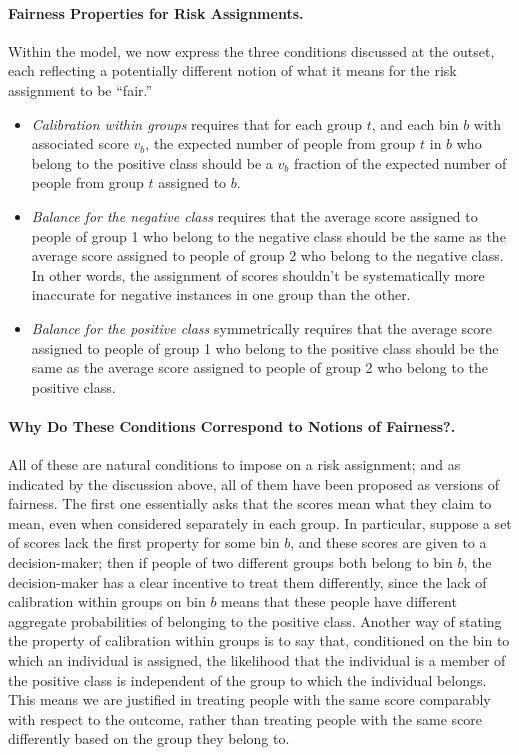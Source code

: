 \documentclass[11pt]{article}
\newcommand{\xhdr}[1]{\vspace{-0.2in} \paragraph*{\bf {#1}.}}
\begin{document}
\xhdr{Fairness Properties for Risk Assignments}
Within the model, we now express the three conditions
discussed at the outset, each reflecting
a potentially different notion of what it means for the
risk assignment to be ``fair.''

\begin{itemize}
\item[(A)] {\em Calibration within groups} requires that for
each group $t$, and each bin $b$ with associated score $v_b$,
the expected number of people from group $t$ in $b$ who belong
to the positive class should be a $v_b$ fraction of the expected number
of people from group $t$ assigned to $b$.
\item[(B)] {\em Balance for the negative class} requires that
the average score assigned to people of group 1 who belong to the
negative class should be the same as
the average score assigned to people of group 2 who belong to the
negative class.
In other words, the assignment of scores shouldn't be systematically
more inaccurate for
negative instances in one group than the other.
\item[(C)] {\em Balance for the positive class} symmetrically requires that
the average score assigned to people of group 1 who belong to the
positive class should be the same as
the average score assigned to people of group 2 who belong to the
positive class.
\end{itemize}

\xhdr{Why Do These Conditions Correspond to Notions of Fairness?}
All of these are natural conditions to impose on a risk assignment;
and as indicated by the discussion above, all of them have been proposed
as versions of fairness.
The first one essentially
asks that the scores mean what they claim to mean, 
even when considered separately in each group.
In particular, suppose a set of scores lack the first property 
for some bin $b$, and these scores
are given to a decision-maker; then if people of two different
groups both belong to bin $b$, 
the decision-maker has a clear incentive
to treat them differently, since the lack of calibration within groups
on bin $b$ means that these people have different 
aggregate probabilities of belonging to the positive class. 
Another way of stating the property of 
calibration within groups is to say that, 
conditioned on the bin to which an
individual is assigned, the likelihood that the individual is a member of the
positive class is independent of the group to which the individual belongs.
This means we are justified in treating people with the same score
comparably with respect to the outcome, rather than treating people
with the same score differently based on the group they belong to.
\end{document}
